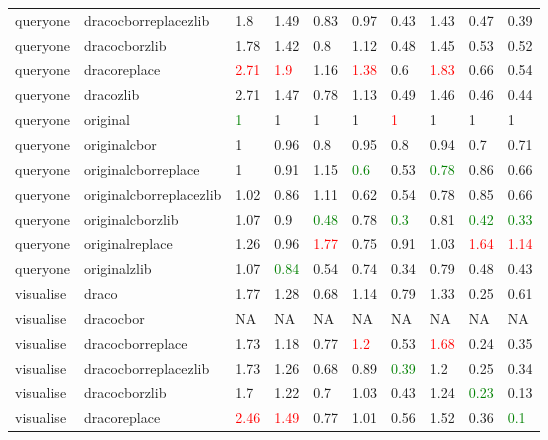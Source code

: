 \begin{landscape}
\begin{longtable}{llllllllll}
queryone & dracocborreplacezlib & 1.8 & 1.49 & 0.83 & 0.97 & 0.43 & 1.43 & 0.47 & 0.39\\
queryone & dracocborzlib & 1.78 & 1.42 & 0.8 & 1.12 & 0.48 & 1.45 & 0.53 & 0.52\\
queryone & dracoreplace & \textcolor{red}{2.71} & \textcolor{red}{1.9} & 1.16 & \textcolor{red}{1.38} & 0.6 & \textcolor{red}{1.83} & 0.66 & 0.54\\
\rowcolor{lightgray}  queryone & dracozlib & 2.71 & 1.47 & 0.78 & 1.13 & 0.49 & 1.46 & 0.46 & 0.44\\
\rowcolor{lightgray}  queryone & original & \textcolor{green}{1} & 1 & 1 & 1 & \textcolor{red}{1} & 1 & 1 & 1\\
\rowcolor{lightgray}  queryone & originalcbor & 1 & 0.96 & 0.8 & 0.95 & 0.8 & 0.94 & 0.7 & 0.71\\
\rowcolor{lightgray}  queryone & originalcborreplace & 1 & 0.91 & 1.15 & \textcolor{green}{0.6} & 0.53 & \textcolor{green}{0.78} & 0.86 & 0.66\\
\rowcolor{lightgray}  queryone & originalcborreplacezlib & 1.02 & 0.86 & 1.11 & 0.62 & 0.54 & 0.78 & 0.85 & 0.66\\
\rowcolor{lightgray}  queryone & originalcborzlib & 1.07 & 0.9 & \textcolor{green}{0.48} & 0.78 & \textcolor{green}{0.3} & 0.81 & \textcolor{green}{0.42} & \textcolor{green}{0.33}\\
\rowcolor{lightgray}  queryone & originalreplace & 1.26 & 0.96 & \textcolor{red}{1.77} & 0.75 & 0.91 & 1.03 & \textcolor{red}{1.64} & \textcolor{red}{1.14}\\
\rowcolor{lightgray}  queryone & originalzlib & 1.07 & \textcolor{green}{0.84} & 0.54 & 0.74 & 0.34 & 0.79 & 0.48 & 0.43\\
\rowcolor{lightgray}  visualise & draco & 1.77 & 1.28 & 0.68 & 1.14 & 0.79 & 1.33 & 0.25 & 0.61\\
\rowcolor{lightgray}  visualise & dracocbor & NA & NA & NA & NA & NA & NA & NA & NA\\
\rowcolor{lightgray}  visualise & dracocborreplace & 1.73 & 1.18 & 0.77 & \textcolor{red}{1.2} & 0.53 & \textcolor{red}{1.68} & 0.24 & 0.35\\
\rowcolor{lightgray}  visualise & dracocborreplacezlib & 1.73 & 1.26 & 0.68 & 0.89 & \textcolor{green}{0.39} & 1.2 & 0.25 & 0.34\\
\rowcolor{lightgray}  visualise & dracocborzlib & 1.7 & 1.22 & 0.7 & 1.03 & 0.43 & 1.24 & \textcolor{green}{0.23} & 0.13\\
visualise & dracoreplace & \textcolor{red}{2.46} & \textcolor{red}{1.49} & 0.77 & 1.01 & 0.56 & 1.52 & 0.36 & \textcolor{green}{0.1}\\

\end{longtable}
\end{landscape}

